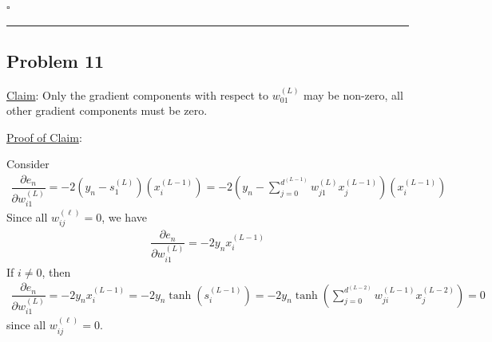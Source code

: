 \documentclass[12pt]{article}
\newcommand*{\QEDB}{\hfill\ensuremath{\square}}
\newcommand{\ParTh}[1]{\left(#1\right)}
\newcommand{\horrule}[1]{\rule{\linewidth}{#1}}
\begin{document}

\QEDB

\horrule{0.5pt}

\subsection*{Problem 11}

\underline{Claim}: Only the gradient components with respect to $w^{\ParTh{L}}_{01}$ may be non-zero, all other gradient components must be zero.

\underline{Proof of Claim}:

Consider
\begin{align}
\dfrac{\partial e_n}{\partial w^{\ParTh{L}}_{i1}}=-2\ParTh{y_n-s^{\ParTh{L}}_1}\ParTh{x^{\ParTh{L-1}}_i}=-2\ParTh{y_n-\sum_{j=0}^{d^{\ParTh{L-1}}}w^{\ParTh{L}}_{j1}x^{\ParTh{L-1}}_j}\ParTh{x^{\ParTh{L-1}}_i}
\end{align}
Since all $w^{\ParTh{\ell}}_{ij}=0$, we have
\begin{align}
\dfrac{\partial e_n}{\partial w^{\ParTh{L}}_{i1}}=-2y_nx^{\ParTh{L-1}}_i%
\end{align}
If $i\neq0$, then
\begin{align}
\dfrac{\partial e_n}{\partial w^{\ParTh{L}}_{i1}}=-2y_nx^{\ParTh{L-1}}_i=-2y_n\tanh\ParTh{s^{\ParTh{L-1}}_i}=-2y_n\tanh\ParTh{\sum_{j=0}^{d^{\ParTh{L-2}}}w^{\ParTh{L-1}}_{ji}x^{\ParTh{L-2}}_j}=0
\end{align}
since all $w^{\ParTh{\ell}}_{ij}=0$.
\end{document}

